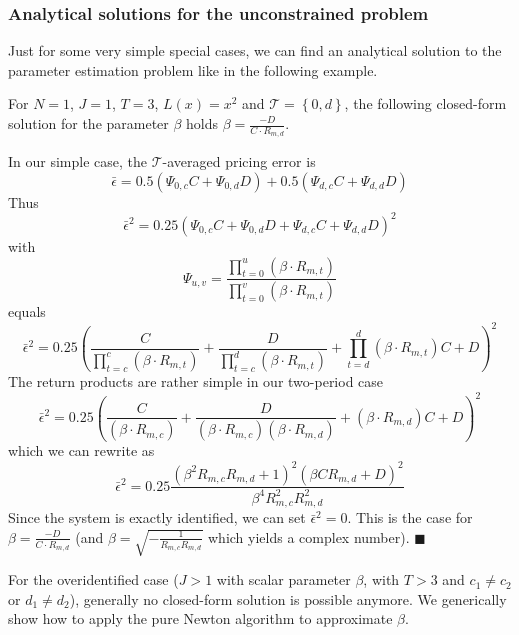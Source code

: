 \subsubsection{Analytical solutions for the unconstrained problem}


Just for some very simple special cases, we can find an analytical solution to the parameter estimation problem like in the following example.


\begin{example}
	For $N=1$, $J=1$, $T=3$, $L(x)=x^2$ and $\mathcal{T} = \left\{ 0, d \right\}$, the following closed-form solution for the parameter $\beta$ holds $\beta = \frac{ - D}{C \cdot R_{m,d}}$.
	
	In our simple case, the $\mathcal{T}$-averaged pricing error is
	\[
	\bar{\epsilon} = 0.5 \left( \Psi_{0,c} C + \Psi_{0,d} D \right) + 0.5 \left( \Psi_{d,c} C + \Psi_{d,d} D \right)
	\]
	Thus
	\[
	\bar{\epsilon}^2 = 0.25 \left( \Psi_{0,c} C + \Psi_{0,d} D + \Psi_{d,c} C + \Psi_{d,d} D \right)^2
	\]
	with
	\[
	\Psi_{u,v} = \frac{\prod_{t=0}^{u} \left( \beta \cdot R_{m,t} \right) }{\prod_{t=0}^{v} \left( \beta \cdot R_{m,t} \right)}
	\]
	equals
	\[
	\bar{\epsilon}^2 = 0.25 \left( 
	\frac{C}{\prod_{t=c}^{c} \left( \beta \cdot R_{m,t} \right)} + 
	\frac{D}{\prod_{t=c}^{d} \left( \beta \cdot R_{m,t} \right)} + 
	\prod_{t=d}^{d} \left( \beta \cdot R_{m,t} \right) C + 
	D 
	\right)^2
	\]
	The return products are rather simple in our two-period case
	\[
	\bar{\epsilon}^2 = 0.25 \left( 
	\frac{C}{ \left( \beta \cdot R_{m,c} \right)} + 
	\frac{D}{ \left( \beta \cdot R_{m,c} \right) \left( \beta \cdot R_{m,d} \right) } + 
	\left( \beta \cdot R_{m,d} \right) C + 
	D 
	\right)^2
	\]
	which we can rewrite as
	\[
	\bar{\epsilon}^2 = 0.25
	\frac{\left( \beta^2 R_{m,c} R_{m,d} +1 \right)^2 \left( \beta C R_{m,d} + D \right)^2}{\beta^4 R_{m,c}^2 R_{m,d}^2}
	\]
	Since the system is exactly identified, we can set $\bar{\epsilon}^2 = 0$.
	This is the case for $\beta = \frac{ - D}{C \cdot R_{m,d}}$ (and $\beta=\sqrt{ - \frac{1}{R_{m,c} R_{m,d}}}$ which yields a complex number).
	$\blacksquare$
\end{example}


For the overidentified case ($J>1$ with scalar parameter $\beta$, with $T>3$ and $c_1 \neq c_2$ or $d_1 \neq d_2$), generally no closed-form solution is possible anymore.
We generically show how to apply the pure Newton algorithm to approximate $\beta$.

\iffalse

